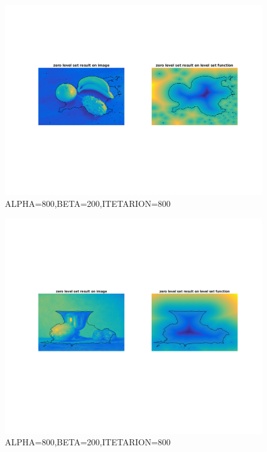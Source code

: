 \documentclass[a4paper, UTF8]{ctexrep}
\begin{document}
			\begin{figure}[htbp!]
				\centering
				\includegraphics[width=\textwidth]{hw3_fig4.png}
				\caption{ALPHA=800,BETA=200,ITETARION=800}
				\label{fig:figure1}
			\end{figure}
			\begin{figure}[htbp!]
				\centering
				\includegraphics[width=\textwidth]{hw3_fig5.png}
				\caption{ALPHA=800,BETA=200,ITETARION=800}
				\label{fig:figure1}
			\end{figure}
\end{document}
